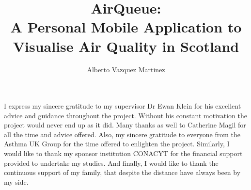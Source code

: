 \documentclass[msc,cs ,logo, abbrevs]{infthesis}
\title{AirQueue: \protect\\ A Personal Mobile Application to Visualise Air Quality in Scotland}
\author{Alberto Vazquez Martinez}
\begin{document}
\begin{preliminary}

\maketitle
\begin{acknowledgements}

I express my sincere gratitude to my supervisor Dr Ewan Klein for his excellent advice and guidance throughout the project. Without his constant motivation the project would never end up as it did.
Many thanks as well to Catherine Magil for all the time and advice offered. Also, my sincere gratitude to everyone from the Asthma UK Group for the time offered to enlighten the project. Similarly, I would like to thank my sponsor institution CONACYT for the financial support provided to undertake my studies. And finally, I would like to thank the continuous support of my family, that despite the distance have always been by my side.

\end{acknowledgements}

\standarddeclaration

\tableofcontents
\listoffigures
\iffalse
\listoftables
\begin{accron}\end{accron}
\fi
\end{preliminary}













\appendix

\end{document}
